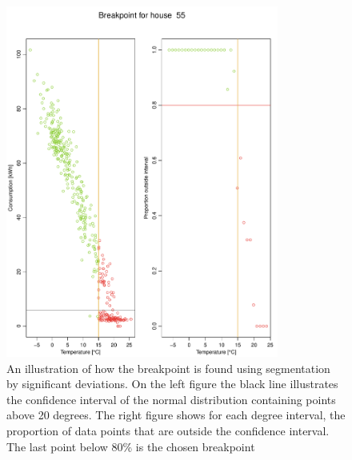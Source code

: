 \begin{figure}
    \centering
    \includegraphics[width=0.8\textwidth]{../../../figures/Breakpoint_55.pdf}
    \caption{An illustration of how the breakpoint is found using segmentation by significant deviations. On the left figure the black line illustrates the confidence interval of the normal distribution containing points above 20 degrees. The right figure shows for each degree interval, the proportion of data points that are outside the confidence interval. The last point below 80\% is the chosen breakpoint}
    \label{fig: Breakpoint55}
\end{figure}
